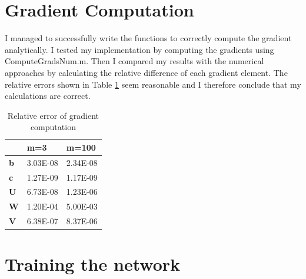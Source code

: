 \section{Gradient Computation}
I managed to successfully write the functions to correctly compute the gradient analytically.
I tested my implementation by computing the gradients using ComputeGradsNum.m.
Then I compared my results with the numerical approaches by calculating the relative difference of each gradient element.
The relative errors shown in Table \ref{tab:grad_err} seem reasonable and I therefore conclude that my calculations are correct.
\begin{table}[ht]
    \centering
    \caption{Relative error of gradient computation}
    \label{tab:grad_err}
    \begin{tabular}{|l|l|l|}
    \hline
               & \textbf{m=3} & \textbf{m=100} \\ \hline
    \textbf{b} & 3.03E-08     & 2.34E-08       \\ \hline
    \textbf{c} & 1.27E-09     & 1.17E-09       \\ \hline
    \textbf{U} & 6.73E-08     & 1.23E-06       \\ \hline
    \textbf{W} & 1.20E-04     & 5.00E-03       \\ \hline
    \textbf{V} & 6.38E-07     & 8.37E-06       \\ \hline
    \end{tabular}
    \end{table}


\section{Training the network}
